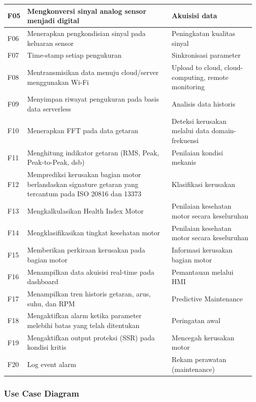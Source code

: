 \documentclass{elsinta}
\begin{document}
\begin{longtable}{|p{1.5cm}|p{7cm}|p{5cm}|}
    
    F05 & Mengkonversi sinyal analog sensor menjadi 
    digital & Akuisisi data \\
    \hline
    F06 & Menerapkan pengkondisian sinyal pada keluaran 
    sensor & Peningkatan kualitas sinyal \\
    \hline
    F07 & Time-stamp setiap pengukuran & Sinkronisasi 
    parameter \\
    \hline
    F08 & Mentransmisikan data menuju cloud/server 
    menggunakan Wi-Fi & Upload to cloud, cloud-computing,
    remote monitoring \\
    \hline
    F09 & Menyimpan riwayat pengukuran pada basis data
    serverless & Analisis data historis \\
    \hline
    F10 & Menerapkan FFT pada data getaran & Deteksi 
    kerusakan melalui data domain-frekuensi\\
    \hline
    F11 & Menghitung indikator getaran (RMS, Peak, 
    Peak-to-Peak, dsb) & Penilaian kondisi mekanis \\
    \hline
    F12 & Memprediksi kerusakan bagian motor berlandaskan
    signature getaran yang tercantum pada ISO 20816 dan 
    13373 & Klasifikasi kerusakan \\
    \hline
    F13 & Mengkalkulasikan Health Index Motor & Penilaian
    kesehatan motor secara keseluruhan \\
    \hline
    F14 & Mengklasifikasikan tingkat kesehatan motor & Penilaian kesehatan motor secara keseluruhan \\
    \hline
    F15 & Memberikan perkiraan kerusakan pada bagian motor & Informasi kerusakan bagian motor \\
    \hline
    F16 & Menampilkan data akuisisi real-time pada dashboard & Pemantauan melalui HMI \\
    \hline
    F17 & Menampilkan tren historis getaran, arus, suhu, dan RPM & Predictive Maintenance \\
    \hline
    F18 & Mengaktifkan alarm ketika parameter melebihi batas yang telah ditentukan & Peringatan awal \\
    \hline
    F19 & Mengaktifkan output proteksi (SSR) pada kondisi kritis & Mencegah kerusakan motor \\
    \hline
    F20 & Log event alarm & Rekam perawatan (maintenance) \\
    \hline
\end{longtable}

\subsubsection{Use Case Diagram}
\end{document}
